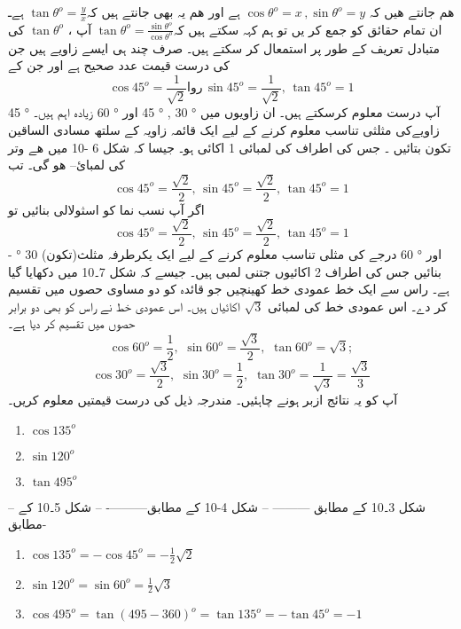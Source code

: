  ھم جانتے ھیں کہ \(\cos \theta^o =x \, , \sin \theta^o =y\) ہے اور ھم یہ بھی جانتے ہیں کہ\(\tan \theta^o =\frac{y}{x}\) ہےـ ان تمام  حقائق کو جمع کر یں تو ہم کہہ سکتے ہیں کہ\(\tan \theta^o =\frac{\sin \theta^o}{\cos \theta^o}\)
آپ ، \(\tan \theta^o\) کی متبادل تعریف کے طور پر استمعال کر سکتے ہیں۔ 
صرف چند ہی ایسے زاویے ہیں جن کی درست قیمت عدد صحیح ہے اور جن کے\[\cos 45^o =\frac{1}{\sqrt{2}} اور \,\sin 45^o =\frac{1}{\sqrt{2}}, \, \tan 45^o =1 \] آپ درست معلوم کرسکتے ہیں۔ ان زاویوں میں     ° 30 ,  ° 45 اور ° 60  زیادہ اہم ہیں۔  ° 45  زاویےکی مثلثی  تناسب  معلوم کرنے کے لیے ایک قائمہ زاویہ کے سلتھ مسادی الساقین تکون بتائیں ۔ جس کی اطراف کی لمبائی 1 اکائی ہو۔ جیسا کہ شکل 6 -10  میں ھے وتر کی لمبائ-- ھو گی۔ تب \[\cos 45^o =\frac{\sqrt{2}}{2}, \,\sin 45^o =\frac{\sqrt{2}}{2}, \, \tan 45^o =1 \]
اگر آپ نسب نما کو اسثولالی بنائیں تو\[\cos 45^o =\frac{\sqrt{2}}{2}, \,\sin 45^o =\frac{\sqrt{2}}{2}, \, \tan 45^o =1 \]
-  ° 30 اور ° 60 درجے کی مثلی تناسب معلوم کرنے کے لیے ایک یکرطرفہ مثلث(تکون) بنائیں جس کی اطراف 2 اکائیوں جتنی لمبی ہیں۔ جیسے کہ شکل 7۔10 میں دکھایا گیا ہے۔ راس سے ایک خط عمودی خط کھینچیں جو قائدہ کو دو مساوی حصوں میں تقسیم کر دے۔ اس عمودی خط کی لمبائی \(\sqrt{3}\) اکائیاں ہیں۔ اس عمودی خط نے راس کو بھی دو برابر حصوں میں تقسیم کر دیا ہے۔
\[\cos 60^o =\frac{1}{2}, \, \, \sin 60^o =\frac{\sqrt{3}}{2}, \, \, \tan 60^o =\sqrt{3}; \]
\[\cos 30^o =\frac{\sqrt{3}}{2}, \, \, \sin 30^o =\frac{1}{2}, \, \, \tan 30^o =\frac{1}{\sqrt{3}}=\frac{\sqrt{3}}{3} \]
آپ کو یہ نتائج ازبر ہونے چاہئیں۔
مندرجہ ذیل کی درست قیمتیں معلوم کریں۔
\begin{multicols}{3}
\begin{enumerate}[aـ]
\item \( \cos 135^o\)

\item \(\sin 120^o\)

\item \(\tan 495^o\)

\end{enumerate}
\end{multicols}
-- شکل 3۔10 کے مطابق ---------
-- شکل 4-10 کے مطابق----------
-- شکل 5۔10 کے مطابق-
\begin{enumerate}[aـ]
\item \(\cos 135^o=-\cos 45^o =-\frac{1}{2}\sqrt{2}\)
\item \(\sin 120^o=\sin 60^o =\frac{1}{2}\sqrt{3}\)
\item \(\cos 495^o=\tan (495-360)^o =\tan 135^o =-\tan 45^o =-1\)
\end{enumerate}

